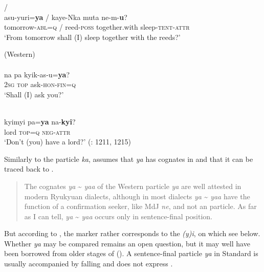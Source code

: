     \ex
    /\\
    \gll asu-yuri=\textbf{{ya}} / kaye-Nka muta ne-m-\textbf{{u}}?\\
    tomorrow-\textsc{abl=q}  /  reed-\textsc{poss}  together.with sleep-\textsc{tent}-\textsc{attr}\\
    \glt ‘From tomorrow shall (I) sleep together with the reeds?’ \citep[832]{Kupchik2011}
    \z
    \z

\ea%
    \label{ex:japa:11}
     (Western)\\
    \ea
    \\
    \gll na  pa  kyik-as-u=\textbf{{ya}}?\\
    2\textsc{sg}  \textsc{top}  ask-\textsc{hon}-\textsc{fin=q}\\
    \glt ‘Shall (I) ask you?’
    
    \ex
    \\
    \gll kyimyi    pa=\textbf{{ya}} na-\textbf{{kyi}}?\\
    lord    \textsc{top=q}    \textsc{neg}-\textsc{attr}\\
    \glt ‘Don’t (you) have a lord?’ (\citealt{Vovin2009}: 1211, 1215)
    \z
    \z

\noindent Similarly to the particle \textit{ka}, \citet[1219]{Vovin2009} assumes that \textit{ya} has cognates in  and that it can be traced back to .

\begin{quote}
The cognates \textit{ya} {\textasciitilde} \textit{yaa} of the Western   particle \textit{ya} are well attested in modern Ryukyuan dialects, although in most dialects \textit{ya} {\textasciitilde} \textit{yaa} have the function of a confirmation seeker, like MdJ \textit{ne}, and not an  particle. As far as I can tell, \textit{ya} {\textasciitilde} \textit{yaa} occurs only in sentence-final position.
\end{quote}

But according to \citet[305]{Shinzato2015}, the  marker rather corresponds to the   \textit{(y)i}, on which see below. Whether  \textit{ya} may be compared remains an open question, but it may well have been borrowed from older stages of  (). A sentence-final particle \textit{ya} in Standard  is usually accompanied by falling  and does not express  \citep[298]{Hasegawa2015}.

